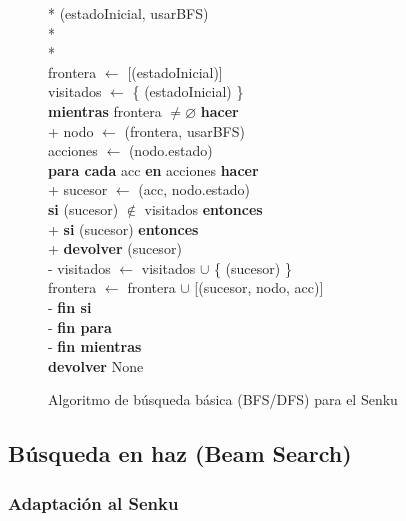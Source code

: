 \documentclass[conference,a4paper]{IEEEtran}
\begin{document}
\begin{figure}
  \small
  \begin{pseudo}*
    (estadoInicial, usarBFS) \\*
     \\*
     \\
    frontera $\leftarrow$ [(estadoInicial)] \\
    visitados $\leftarrow$ \{ (estadoInicial) \} \\
    \textbf{mientras} frontera $\neq \varnothing$ \textbf{hacer} \\+
      nodo $\leftarrow$ (frontera, usarBFS) \\
      acciones $\leftarrow$ (nodo.estado) \\
      \textbf{para cada} acc \textnormal{\textbf{en}} acciones \textbf{hacer} \\+
        sucesor $\leftarrow$ (acc, nodo.estado) \\
        \textbf{si} (sucesor) $\notin$ visitados \textbf{entonces} \\+
          \textbf{si} (sucesor) \textbf{entonces} \\+
            \textbf{devolver} (sucesor) \\-
          visitados $\leftarrow$ visitados $\cup$ \{ (sucesor) \} \\
          frontera $\leftarrow$ frontera $\cup$ [(sucesor, nodo, acc)] \\-
        \textbf{fin si} \\-
      \textbf{fin para} \\-
    \textbf{fin mientras} \\
    \textbf{devolver} None
  \end{pseudo}
  \caption{Algoritmo de búsqueda básica (BFS/DFS) para el Senku}
  \label{pcd:basica}
\end{figure}

\subsection{Búsqueda en haz (Beam Search)}

\subsubsection{Adaptación al Senku}
\end{document}
